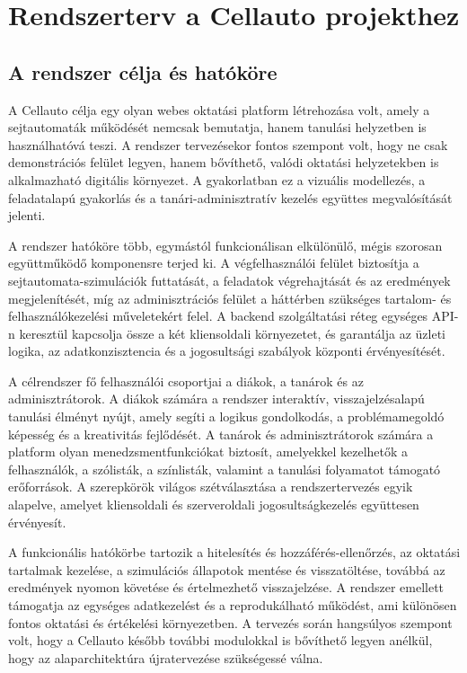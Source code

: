 \documentclass{thesis-ekf}
\begin{document}
\chapter{Rendszerterv a Cellauto projekthez}

\section{A rendszer célja és hatóköre}
A Cellauto célja egy olyan webes oktatási platform létrehozása volt, amely a sejtautomaták működését nemcsak bemutatja, hanem tanulási helyzetben is használhatóvá teszi. A rendszer tervezésekor fontos szempont volt, hogy ne csak demonstrációs felület legyen, hanem bővíthető, valódi oktatási helyzetekben is alkalmazható digitális környezet. A gyakorlatban ez a vizuális modellezés, a feladatalapú gyakorlás és a tanári-adminisztratív kezelés együttes megvalósítását jelenti.

A rendszer hatóköre több, egymástól funkcionálisan elkülönülő, mégis szorosan együttműködő komponensre terjed ki. A végfelhasználói felület biztosítja a sejtautomata\allowbreak-szimulációk futtatását, a feladatok végrehajtását és az eredmények megjelenítését, míg az adminisztrációs felület a háttérben szükséges tartalom- és felhasználókezelési műveletekért felel. A backend szolgáltatási réteg egységes API-n keresztül kapcsolja össze a két kliensoldali környezetet, és garantálja az üzleti logika, az adatkonzisztencia és a jogosultsági szabályok központi érvényesítését.

A célrendszer fő felhasználói csoportjai a diákok, a tanárok és az adminisztrátorok. A diákok számára a rendszer interaktív, visszajelzésalapú tanulási élményt nyújt, amely segíti a logikus gondolkodás, a problémamegoldó képesség és a kreativitás fejlődését. A tanárok és adminisztrátorok számára a platform olyan menedzsmentfunkciókat biztosít, amelyekkel kezelhetők a felhasználók, a szólisták, a színlisták, valamint a tanulási folyamatot támogató erőforrások. A szerepkörök világos szétválasztása a rendszertervezés egyik alapelve, amelyet kliensoldali és szerveroldali jogosultságkezelés együttesen érvényesít.

A funkcionális hatókörbe tartozik a hitelesítés és hozzáférés-ellenőrzés, az oktatási tartalmak kezelése, a szimulációs állapotok mentése és visszatöltése, továbbá az eredmények nyomon követése és értelmezhető visszajelzése. A rendszer emellett támogatja az egységes adatkezelést és a reprodukálható működést, ami különösen fontos oktatási és értékelési környezetben. A tervezés során hangsúlyos szempont volt, hogy a Cellauto később további modulokkal is bővíthető legyen anélkül, hogy az alaparchitektúra újratervezése szükségessé válna.
\end{document}

